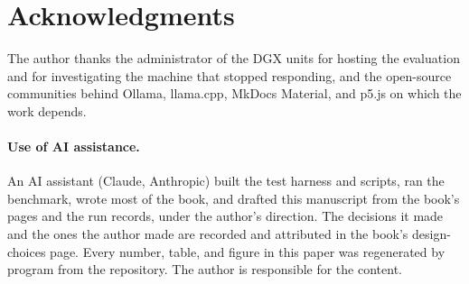 \section*{Acknowledgments}
The author thanks the administrator of the DGX units for hosting the evaluation and for investigating the machine that stopped responding, and the open-source communities behind Ollama, llama.cpp, MkDocs Material, and p5.js on which the work depends.

\paragraph{Use of AI assistance.}
An AI assistant (Claude, Anthropic) built the test harness and scripts, ran the benchmark, wrote most of the book, and drafted this manuscript from the book's pages and the run records, under the author's direction. The decisions it made and the ones the author made are recorded and attributed in the book's design-choices page. Every number, table, and figure in this paper was regenerated by program from the repository. The author is responsible for the content.
